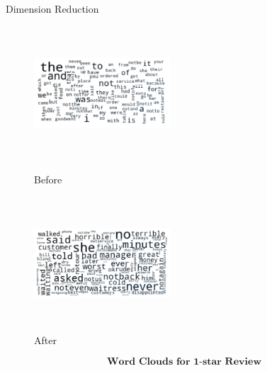 \documentclass[10pt]{beamer}
\begin{document}
\begin{frame}{Dimension Reduction}
\begin{figure}[htbp]
\centering
\setlength{\belowcaptionskip}{2pt} 
\begin{minipage}[t]{0.48\textwidth}
\centering
\setlength{\belowcaptionskip}{1pt} 
\includegraphics[width=5.1cm,height=5cm]{../image/dist1_ori.png}
\caption{Before}
\end{minipage}
\begin{minipage}[t]{0.48\textwidth}
\centering
\setlength{\belowcaptionskip}{1pt} 
\includegraphics[width=5.1cm,height=5cm]{../image/dist1_1.png}
\caption{After}
\end{minipage}
\end{figure}
$$\textbf{Word Clouds for 1-star Review}$$
\end{frame}
\end{document}
